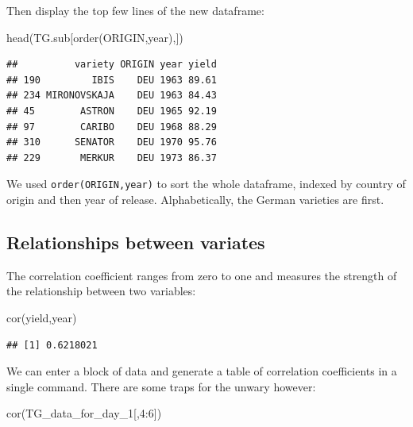 \documentclass[
]{book}
\newenvironment{Shaded}{\begin{snugshade}}{\end{snugshade}}
\newcommand{\DecValTok}[1]{\textcolor[rgb]{0.00,0.00,0.81}{#1}}
\newcommand{\FunctionTok}[1]{\textcolor[rgb]{0.00,0.00,0.00}{#1}}
\newcommand{\NormalTok}[1]{#1}
\newcommand{\SpecialCharTok}[1]{\textcolor[rgb]{0.00,0.00,0.00}{#1}}
\begin{document}
Then display the top few lines of the new dataframe:

\begin{Shaded}
\begin{Highlighting}[]
\FunctionTok{head}\NormalTok{(TG.sub[}\FunctionTok{order}\NormalTok{(ORIGIN,year),])}
\end{Highlighting}
\end{Shaded}

\begin{verbatim}
##          variety ORIGIN year yield
## 190         IBIS    DEU 1963 89.61
## 234 MIRONOVSKAJA    DEU 1963 84.43
## 45        ASTRON    DEU 1965 92.19
## 97        CARIBO    DEU 1968 88.29
## 310      SENATOR    DEU 1970 95.76
## 229       MERKUR    DEU 1973 86.37
\end{verbatim}

We used \texttt{order(ORIGIN,year)} to sort the whole dataframe, indexed by country of origin and then year of release. Alphabetically, the German varieties are first.

\hypertarget{relationships-between-variates}{%
\subsection{Relationships between variates}\label{relationships-between-variates}}

The correlation coefficient ranges from zero to one and measures the strength of the relationship between two variables:

\begin{Shaded}
\begin{Highlighting}[]
\FunctionTok{cor}\NormalTok{(yield,year)}
\end{Highlighting}
\end{Shaded}

\begin{verbatim}
## [1] 0.6218021
\end{verbatim}

We can enter a block of data and generate a table of correlation coefficients in a single command.
There are some traps for the unwary however:

\begin{Shaded}
\begin{Highlighting}[]
\FunctionTok{cor}\NormalTok{(TG\_data\_for\_day\_1[,}\DecValTok{4}\SpecialCharTok{:}\DecValTok{6}\NormalTok{])}
\end{Highlighting}
\end{Shaded}
\end{document}
